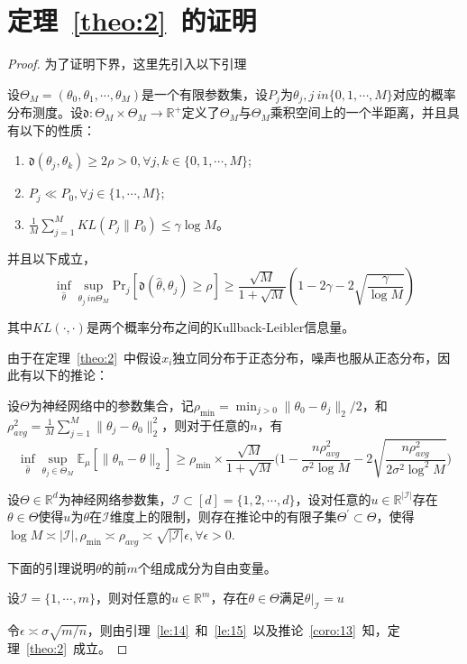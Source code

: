 \section{定理~\ref{theo:2}~的证明}\label{pr:2}

\begin{proof}
为了证明下界，这里先引入以下引理
\begin{lemma}
设$\Theta_M = (\theta_0, \theta_1, \cdots, \theta_M)$是一个有限参数集，设$P_j$为$\theta_j, j\ in \{0,1,\cdots, M\}$对应的概率分布测度。设$\mathfrak{d}:\Theta_M\times \Theta_M\rightarrow \mathbb{R}^+$定义了$\Theta_M$与$\Theta_M$乘积空间上的一个半距离，并且具有以下的性质：
\begin{enumerate}
\item $\mathfrak{d}(\theta_j,\theta_k)\geq 2\rho > 0, \forall j,k\in\{0,1,\cdots,M\}$;
\item $P_j \ll P_0, \forall j \in \{1,\cdots, M\}$;
\item $\frac{1}{M}\sum_{j=1}^M KL(P_j\|P_0)\leq \gamma\log M$。 
\end{enumerate}
\par
并且以下成立，
\begin{equation}
\inf_{\hat{\theta}} \sup_{\theta_j\ in \Theta_M} \mathrm{Pr}_j[\mathfrak{d}(\hat{\theta},\theta_j)\geq \rho] \geq \frac{\sqrt{M}}{1+\sqrt{M}}(1-2\gamma-2\sqrt{\frac{\gamma}{\log M}})
\end{equation}
\end{lemma}
\par
其中$KL(\cdot,\cdot)$是两个概率分布之间的Kullback-Leibler信息量。
\par
由于在定理~\ref{theo:2}~中假设$x_i$独立同分布于正态分布，噪声也服从正态分布，因此有以下的推论：
\begin{corollary}\label{coro:13}
设$\Theta$为神经网络中的参数集合，记$\rho_{\min} = \min_{j>0}\|\theta_0- \theta_j\|_2/2$，和$\rho_{avg}^2 = \frac{1}{M}\sum_{j=1}^M \|\theta_j-\theta_0\|^2_2$，则对于任意的$n$，有
\[
\inf_{\hat{\theta}} \sup_{\theta_j\in \Theta_M} \mathbb{E}_\mu [\|\hat{\theta}_n-\theta\|_2] \geq \rho_{\min} \times\frac{\sqrt{M}}{1+\sqrt{M}}\bigg(1-\frac{n\rho_{avg}^2}{\sigma^2\log M}-2\sqrt{\frac{n\rho_{avg}^2}{2\sigma^2\log^2 M}}\bigg)
\]
\end{corollary}

\begin{lemma}\label{le:14}
设$\Theta \in \mathbb{R}^d$为神经网络参数集，$\mathcal{I}\subset [d]=\{1,2,\cdots,d\}$，设对任意的$u \in \mathbb{R}^{|\mathcal{I}|}$存在$\theta\in \Theta$使得$u$为$\theta$在$\mathcal{I}$维度上的限制，则存在推论中的有限子集$\Theta^\prime \subset \Theta$，使得$\log M \asymp |\mathcal{I}|, \rho_{\min} \asymp \rho_{avg} \asymp \sqrt{|\mathcal{I}|}\epsilon, \forall \epsilon > 0$.
\end{lemma}
\par
下面的引理说明$\theta$的前$m$个组成成分为自由变量。
\begin{lemma}\label{le:15}
设$\mathcal{I} = \{1,\cdots,m\}$，则对任意的$u\in \mathbb{R}^m$，存在$\theta \in \Theta$满足$\theta|_{\mathcal{I}} = u$
\end{lemma}

\par
令$\epsilon \asymp \sigma \sqrt{m/n}$，则由引理~\ref{le:14}~和~\ref{le:15}~以及推论~\ref{coro:13}~知，定理~\ref{theo:2}~成立。

\end{proof}


